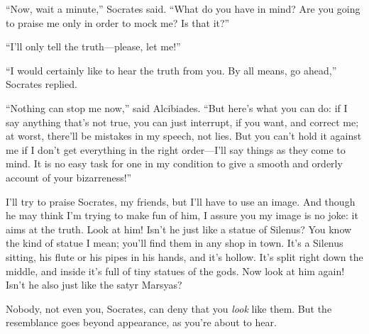 “Now, wait a minute,” Socrates said. “What do you have in mind? Are you
going to praise me only in order to mock me? Is that it?”

“I'll only tell the truth---please, let me!”

“I would certainly like to hear the truth from you. By all means, go
ahead,” Socrates replied.

“Nothing can stop me now,” said Alcibiades. “But here's what you can do:
if I say anything that's not true, you can just interrupt, if you want,
and correct me; at worst, there'll be mistakes in my speech, not lies.
But  you can't hold it against me if I don't get
everything in the right order---I'll say things as they come to mind. It
is no easy task for one in my condition to give a smooth and orderly
account of your bizarreness!”

\blank[line]

I'll try to praise Socrates, my friends, but I'll have to use an image.
And though he may think I'm trying to make fun of him, I assure you my
image is no joke: it aims at the truth. Look at him! Isn't he just like
a statue  of Silenus? You know the kind of statue I mean; you'll
find them in any shop in town. It's a Silenus sitting, his
flute or his pipes in
his hands, and it's hollow. It's split right down the middle, and inside
it's full of tiny statues of the gods. Now look at him again! Isn't he
also just like the satyr
Marsyas?

Nobody, not even you, Socrates, can deny that you {\em look} like them.
But the resemblance goes beyond appearance, as you're about to hear.

